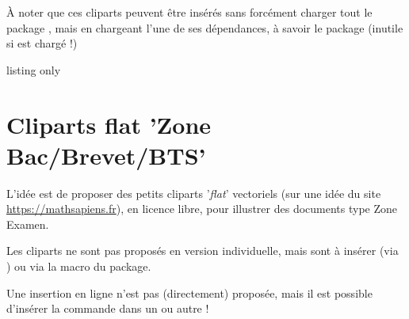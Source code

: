 \begin{tipblock}
 À noter que ces cliparts peuvent être insérés sans forcément charger tout le package , mais en chargeant l'une de ses dépendances, à savoir le package  (inutile si  est chargé !)
\end{tipblock}

\begin{PresCodeTexPL}{listing only}
\usepackage{ProfLycee-Pictosbac}
\end{PresCodeTexPL}

\pagebreak

\section{Cliparts flat 'Zone Bac/Brevet/BTS'}\label{clipartsflat}

\begin{tipblock}
 L'idée est de proposer des petits cliparts '\textit{flat}' vectoriels (sur une idée du site \url{https://mathsapiens.fr}), en licence libre, pour illustrer des documents type \textsf{Zone Examen}.

Les cliparts ne sont pas proposés en version individuelle, mais sont à insérer (via ) ou via la macro du package.

\smallskip

Une insertion en ligne n'est pas (directement) proposée, mais il est possible d'insérer la commande dans un  ou autre !
\end{tipblock}

\newcommand\affpictoflatcroptblr[1]{$\vcenter{\hbox{\pflflatpictobac*[height=0.75cm]{#1}}}$}
\newcommand\affpictoflattblr[1]{$\vcenter{\hbox{\pflflatpictobac[height=0.75cm]{#1}}}$}


